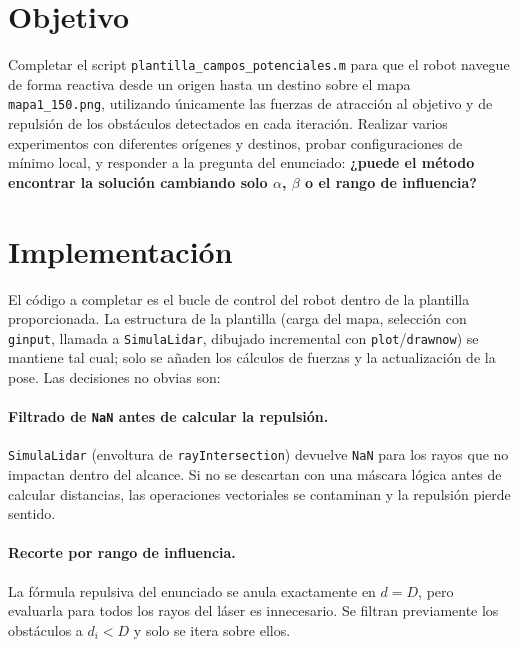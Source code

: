 \section{Objetivo}
Completar el script \texttt{plantilla\_campos\_potenciales.m} para que el robot navegue de forma reactiva desde un origen hasta un destino sobre el mapa \texttt{mapa1\_150.png}, utilizando \'{u}nicamente las fuerzas de atracci\'{o}n al objetivo y de repulsi\'{o}n de los obst\'{a}culos detectados en cada iteraci\'{o}n. Realizar varios experimentos con diferentes or\'{i}genes y destinos, probar configuraciones de m\'{i}nimo local, y responder a la pregunta del enunciado: \textbf{¿puede el m\'{e}todo encontrar la soluci\'{o}n cambiando solo $\alpha$, $\beta$ o el rango de influencia?}


\section{Implementaci\'{o}n}

El c\'{o}digo a completar es el bucle de control del robot dentro de la plantilla proporcionada. La estructura de la plantilla (carga del mapa, selecci\'{o}n con \texttt{ginput}, llamada a \texttt{SimulaLidar}, dibujado incremental con \texttt{plot}/\texttt{drawnow}) se mantiene tal cual; solo se a\~{n}aden los c\'{a}lculos de fuerzas y la actualizaci\'{o}n de la pose. Las decisiones no obvias son:

\paragraph{Filtrado de \texttt{NaN} antes de calcular la repulsi\'{o}n.} \texttt{SimulaLidar} (envoltura de \texttt{rayIntersection}) devuelve \texttt{NaN} para los rayos que no impactan dentro del alcance. Si no se descartan con una m\'{a}scara l\'{o}gica antes de calcular distancias, las operaciones vectoriales se contaminan y la repulsi\'{o}n pierde sentido.

\paragraph{Recorte por rango de influencia.} La f\'{o}rmula repulsiva del enunciado se anula exactamente en $d = D$, pero evaluarla para todos los rayos del l\'{a}ser es innecesario. Se filtran previamente los obst\'{a}culos a $d_i < D$ y solo se itera sobre ellos.

